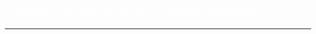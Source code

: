 \begin{titlepage}
\pagecolor{white}
\newcommand{\R}{\ensuremath{\mathbb{R}}}
\BgThispage
{}
\vspace*{-1.1cm}
\noindent
\def\titulo#1{\section{#1}}

\section{\bf\large\textcolor{white}{V\'{i}deos Interactivos en C\'{a}lculo Integral}}
\vspace*{2cm}\par
\noindent

\begin{minipage}{0.5\linewidth}
\begin{minipage}{0.45\linewidth}
    \begin{flushright}
        \printauthor
    \end{flushright}
\end{minipage} \hspace{-3pt}
%
\begin{minipage}{0.02\linewidth}
   \color{ptctitle} \rule{1pt}{225pt}
\end{minipage} 
\end{minipage}
\hspace*{-4.5cm}
\begin{minipage}{0.85\linewidth}
\begin{minipage}{0.85\linewidth}
\footnotesize
\vspace{5pt}
    \begin{resumen}
    

\end{resumen}
\end{minipage}
\end{minipage}
\end{titlepage}
